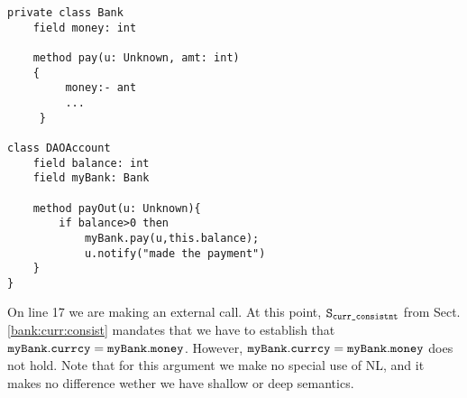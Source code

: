 \begin{lstlisting}[language=chainmail, mathescape=true, frame=lines]
private class Bank
    field money: int
    
    method pay(u: Unknown, amt: int)
    {
         money:- ant
         ...
     }

class DAOAccount
	field balance: int
	field myBank: Bank
	
	method payOut(u: Unknown){
		if balance>0 then
			myBank.pay(u,this.balance);
			u.notify("made the payment")
	}
}
\end{lstlisting}

On line 17 we are making an external call. At this point, $ {\texttt{S}}_{{\texttt{curr\_consistnt}}}$ from Sect. \ref{bank:curr:consist} mandates that we have to establish that ${{\texttt{myBank}}.{\texttt{currcy}}= {\texttt{myBank}}.{\texttt{money}}}$. However, ${{\texttt{myBank}}.{\texttt{currcy}}= {\texttt{myBank}}.{\texttt{money}}}$ does not hold. Note that for this argument we make no special use of NL, and it makes no difference wether we have shallow or deep semantics.
